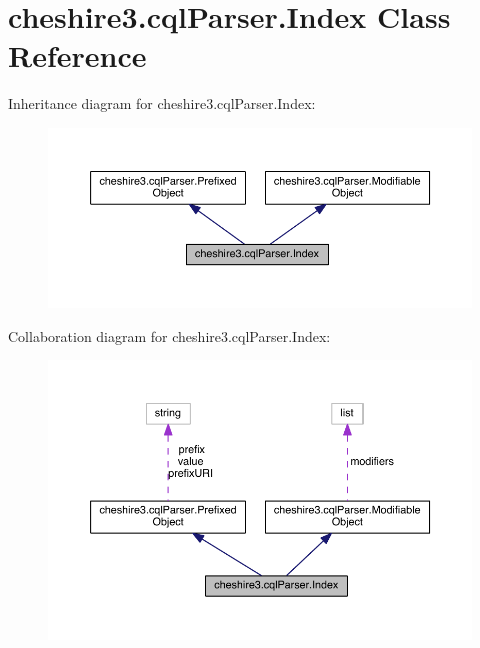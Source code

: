 \hypertarget{classcheshire3_1_1cql_parser_1_1_index}{\section{cheshire3.\-cql\-Parser.\-Index Class Reference}
\label{classcheshire3_1_1cql_parser_1_1_index}
}


Inheritance diagram for cheshire3.\-cql\-Parser.\-Index\-:
\nopagebreak
\begin{figure}[H]
\begin{center}
\leavevmode
\includegraphics[width=350pt]{classcheshire3_1_1cql_parser_1_1_index__inherit__graph}
\end{center}
\end{figure}


Collaboration diagram for cheshire3.\-cql\-Parser.\-Index\-:
\nopagebreak
\begin{figure}[H]
\begin{center}
\leavevmode
\includegraphics[width=350pt]{classcheshire3_1_1cql_parser_1_1_index__coll__graph}
\end{center}
\end{figure}
